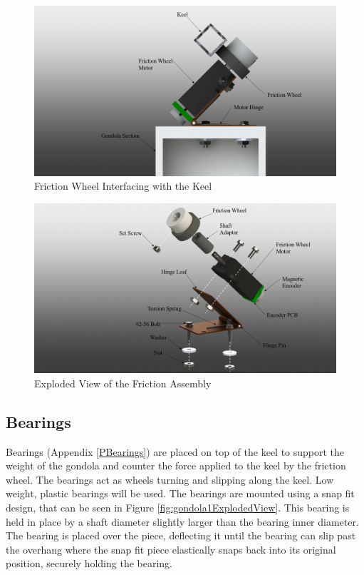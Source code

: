 \documentclass[../main.tex]{subfiles}
\begin{document}
\begin{figure}[H]
	\centering
	\includegraphics[width=.8\linewidth]{img/design/gondola/frictionWheelOnGondola.png}
	\caption{Friction Wheel Interfacing with the Keel}
		\label{fig:frictionWheelOnGondola}
\end{figure}
\begin{figure}[H]
	\centering
	\includegraphics[width=.8\linewidth]{img/design/gondola/explodedFrictionWheel.png}
	\caption{Exploded View of the Friction Assembly}
	\label{fig:explodedFrictionWheel}
\end{figure}

\subsection{Bearings}
Bearings (Appendix \ref{PBearings}) are placed on top of the keel to support the weight of the gondola and counter the force applied to the keel by the friction wheel. The bearings act as wheels turning and slipping along the keel. Low weight, plastic bearings will be used. The bearings are mounted using a snap fit design, that can be seen in Figure \ref{fig:gondola1ExplodedView}. This bearing is held in place by a shaft diameter slightly larger than the bearing inner diameter. The bearing is placed over the piece, deflecting it until the bearing can slip past the overhang where the snap fit piece elastically snaps back into its original position, securely holding the bearing.
\\
\end{document}
